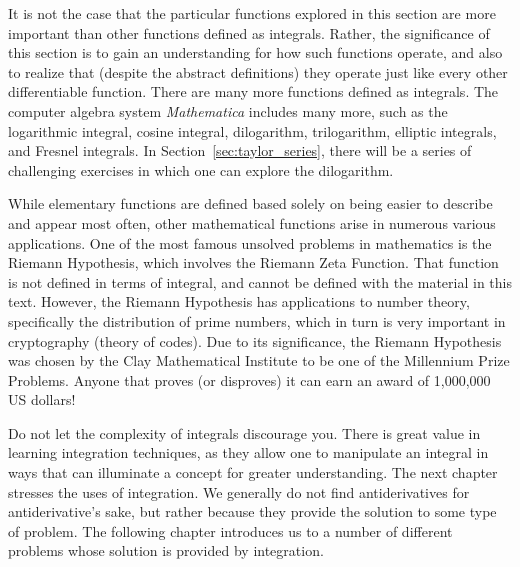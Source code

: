 It is not the case that the particular functions explored in this section are more important than other functions defined as integrals.  Rather, the significance of this section is to gain an understanding for how such functions operate, and also to realize that (despite the abstract definitions) they operate just like every other differentiable function.  There are many more functions defined as integrals.  The computer algebra system \textit{Mathematica}\textsuperscript{\textregistered} includes many more, such as the logarithmic integral, cosine integral, dilogarithm, trilogarithm, elliptic integrals, and Fresnel integrals.  In Section~\ref{sec:taylor_series}, there will be a series of challenging exercises in which one can explore the dilogarithm.  %

While elementary functions are defined based solely on being easier to describe and appear most often, other mathematical functions arise in numerous various applications.
One of the most famous unsolved problems in mathematics is the Riemann Hypothesis, which involves the Riemann Zeta Function.  That function is not defined in terms of integral, and cannot be defined with the material in this text.  However, the Riemann Hypothesis has applications to number theory, specifically the distribution of prime numbers, which in turn is very important in cryptography (theory of codes).  Due to its significance, the Riemann Hypothesis was chosen by the Clay Mathematical Institute to be one of the Millennium Prize Problems.  Anyone that proves (or disproves) it can earn an award of 1,000,000 US dollars!

Do not let the complexity of integrals discourage you. There is great value in learning integration techniques, as they allow one to manipulate an integral in ways that can illuminate a concept for greater understanding. The next chapter stresses the uses of integration. We generally do not find antiderivatives for antiderivative's sake, but rather because they provide the solution to some type of problem. The following chapter introduces us to a number of different problems whose solution is provided by integration.




